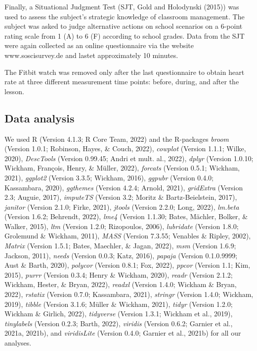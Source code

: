 \documentclass[
  man]{apa6}
\begin{document}
Finally, a Situational Judgment Test (SJT, Gold and Holodynski (2015)) was used to assess the subject's strategic knowledge of classroom management. The subject was asked to judge alternative actions on school scenarios on a 6-point rating scale from 1 (A) to 6 (F) according to school grades. Data from the SJT were again collected as an online questionnaire via the website www.soscisurvey.de and lastet approximately 10 minutes.

The Fitbit watch was removed only after the last questionnaire to obtain heart rate at three different measurement time points: before, during, and after the lesson.

\hypertarget{data-analysis}{%
\subsection{Data analysis}\label{data-analysis}}

We used R (Version 4.1.3; R Core Team, 2022) and the R-packages \emph{broom} (Version 1.0.1; Robinson, Hayes, \& Couch, 2022), \emph{cowplot} (Version 1.1.1; Wilke, 2020), \emph{DescTools} (Version 0.99.45; Andri et mult. al., 2022), \emph{dplyr} (Version 1.0.10; Wickham, François, Henry, \& Müller, 2022), \emph{forcats} (Version 0.5.1; Wickham, 2021), \emph{ggplot2} (Version 3.3.5; Wickham, 2016), \emph{ggpubr} (Version 0.4.0; Kassambara, 2020), \emph{ggthemes} (Version 4.2.4; Arnold, 2021), \emph{gridExtra} (Version 2.3; Auguie, 2017), \emph{imputeTS} (Version 3.2; Moritz \& Bartz-Beielstein, 2017), \emph{janitor} (Version 2.1.0; Firke, 2021), \emph{jtools} (Version 2.2.0; Long, 2022), \emph{lm.beta} (Version 1.6.2; Behrendt, 2022), \emph{lme4} (Version 1.1.30; Bates, Mächler, Bolker, \& Walker, 2015), \emph{ltm} (Version 1.2.0; Rizopoulos, 2006), \emph{lubridate} (Version 1.8.0; Grolemund \& Wickham, 2011), \emph{MASS} (Version 7.3.55; Venables \& Ripley, 2002), \emph{Matrix} (Version 1.5.1; Bates, Maechler, \& Jagan, 2022), \emph{msm} (Version 1.6.9; Jackson, 2011), \emph{needs} (Version 0.0.3; Katz, 2016), \emph{papaja} (Version 0.1.0.9999; Aust \& Barth, 2020), \emph{polycor} (Version 0.8.1; Fox, 2022), \emph{ppcor} (Version 1.1; Kim, 2015), \emph{purrr} (Version 0.3.4; Henry \& Wickham, 2020), \emph{readr} (Version 2.1.2; Wickham, Hester, \& Bryan, 2022), \emph{readxl} (Version 1.4.0; Wickham \& Bryan, 2022), \emph{rstatix} (Version 0.7.0; Kassambara, 2021), \emph{stringr} (Version 1.4.0; Wickham, 2019), \emph{tibble} (Version 3.1.6; Müller \& Wickham, 2021), \emph{tidyr} (Version 1.2.0; Wickham \& Girlich, 2022), \emph{tidyverse} (Version 1.3.1; Wickham et al., 2019), \emph{tinylabels} (Version 0.2.3; Barth, 2022), \emph{viridis} (Version 0.6.2; Garnier et al., 2021a, 2021b), and \emph{viridisLite} (Version 0.4.0; Garnier et al., 2021b) for all our analyses.
\end{document}
